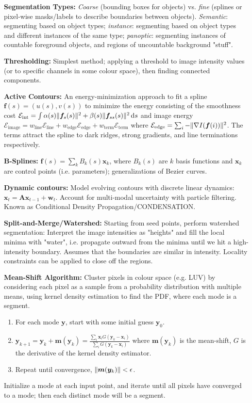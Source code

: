 \documentclass[twocolumn, 10pt]{extarticle}
\begin{document}
\textbf{Segmentation Types:} \textit{Coarse} (bounding boxes for objects) vs. \textit{fine} (splines or pixel-wise
masks/labels to describe boundaries between objects). \textit{Semantic}: segmenting based on object types;
\textit{instance}: segmenting based on object types and different instances of the same type; \textit{panoptic}:
segmenting instances of countable foreground objects, and regions of uncountable background "stuff".

\textbf{Thresholding:} Simplest method; applying a threshold to image intensity values (or to specific channels in some
colour space), then finding connected components.

\textbf{Active Contours:} An energy-minimization approach to fit a spline \(\bm f(s) = (u(s), v(s))\) to minimize the
energy consisting of the smoothness cost 
\(\mathcal E_\text{int} = \int \alpha(s)\lVert\bm f_s(s)\rVert^2 + \beta(s)\lVert\bm f_{ss}(s)\rVert^2\,\mathrm{d}s\)
and image energy \(\mathcal E_\text{image} = w_\text{line}\mathcal E_\text{line} + w_\text{edge}\mathcal E_\text{edge} + w_\text{term}\mathcal E_\text{term}\)
where \(\mathcal E_\text{edge} = \sum _i -\lVert\nabla I(\bm f(i))\rVert^2\).
The terms attract the spline to dark ridges, strong gradients, and line terminations respectively.

\textbf{B-Splines:} \(\bm f(s) = \sum _k B_k(s)\bm x_k\), where $B_k(s)$ are $k$ basis functions and $\bm x_k$ are
control points (i.e. parameters); generalizations of Bezier curves.

\textbf{Dynamic contours:} Model evolving contours with discrete linear dynamics: $ \bm{x}_t = \bm{A} \bm{x}_{t-1}
+\bm{w}_t$. Account for multi-modal uncertainty with particle filtering. Known as Conditional Density
Propagation/CONDENSATION.

\textbf{Split-and-Merge/Watershed:} Starting from seed points, perform watershed segmentation: Interpret the image
intensities as "heights" and fill the local minima with "water", i.e. propagate outward from the minima until we hit a
high-intensity boundary. Assumes that the boundaries are similar in intensity. Locality constraints can be applied to
close off the regions.

\textbf{Mean-Shift Algorithm:} Cluster pixels in colour space (e.g. LUV) by considering each pixel as a sample from a
probability distribution with multiple means, using kernel density estimation to find the PDF, where each mode is a
segment.
\begin{enumerate}
    \item For each mode $\bm y$, start with some initial guess $\bm y_0$.
    \item $\displaystyle\bm y_{k + 1} = \bm y_k + \bm m(\bm y_k) = \frac{\sum _i\bm x_iG(\bm y_k - \bm x_i)}{\sum _i G(\bm y_k - \bm x_i)}$ where $\bm m(\bm y_k)$ is the mean-shift, $G$ is the derivative of the kernel density estimator.
    \item Repeat until convergence, $\lVert\bm m(\bm y_k)\rVert < \epsilon$.
\end{enumerate}
Initialize a mode at each input point, and iterate until all pixels have converged to a mode; then each distinct mode
will be a segment.
\end{document}

